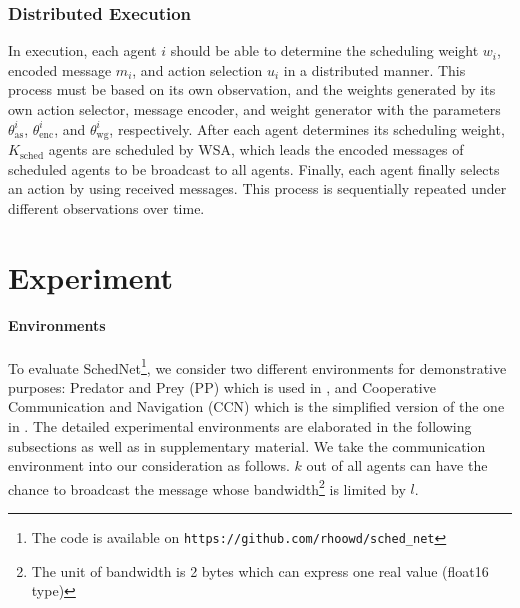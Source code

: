 \documentclass{article} %
\newcommand{\sched}{SchedNet}
\begin{document}
\subsubsection{Distributed Execution}
\label{sec:execution}

 In execution, each agent $i$ should be able to determine the
  scheduling weight $w_i$, encoded message $m_i$, and action selection
  $u_i$ in a distributed manner. This process must be based on its own observation, and the weights generated by 
  its own action selector, message encoder, and weight
  generator with the parameters $\theta^i_{\text{as}}$, $\theta^i_{\text{enc}}$,     and $\theta^i_{\text{wg}}$, respectively.
  After each agent determines its scheduling
  weight, $K_{\text{sched}}$ agents are scheduled by WSA, which leads the encoded
  messages of scheduled agents to be broadcast to all agents. Finally, each agent
  finally selects an action by using received messages. This process is
  sequentially repeated under different observations over time.  


% 
\section{Experiment}
\label{sec:exp}

\paragraph{Environments} To evaluate \sched\footnote{The code is available on \texttt{https://github.com/rhoowd/sched\_net}}, we consider two different
environments for demonstrative purposes: Predator and Prey (PP) which
is used in \citet{stone2000multiagent}, and Cooperative Communication
and Navigation (CCN) which is the simplified version of the one in
\citet{lowe2017multi}. The detailed experimental environments are
elaborated in the following subsections as well as in supplementary material.
We take the communication environment into our consideration as
follows. $k$ out of all agents can have the chance to broadcast
the message whose bandwidth\footnote{The unit of bandwidth is 2 bytes
  which can express one real value (float16 type)} is limited by $l$.
\end{document}
